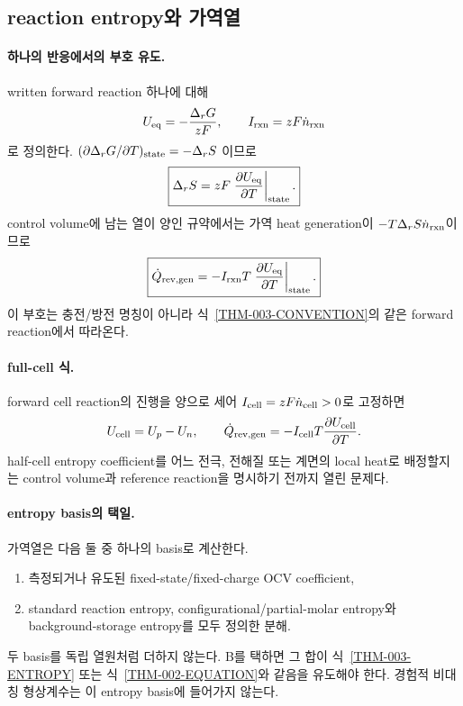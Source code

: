 \subsection{reaction entropy와 가역열}\label{THM-CH2-REVERSIBLE}

\paragraph{ 하나의 반응에서의 부호 유도.}
written forward reaction 하나에 대해
\begin{equation}
U_{\mathrm{eq}}=-\frac{\Delta_rG}{zF},\qquad
I_{\rm rxn}=zF\dot n_{\rm rxn}
\label{THM-003-CONVENTION}
\end{equation}
로 정의한다. $(\partial\Delta_rG/\partial T)_{\rm state}=-\Delta_rS$
이므로
\begin{equation}
\boxed{
\Delta_rS=zF
\left.\frac{\partial U_{\mathrm{eq}}}{\partial T}\right|_{\rm state}.
}
\label{THM-003-ENTROPY}
\end{equation}
control volume에 남는 열이 양인 규약에서는 가역 heat generation이
$-T\Delta_rS\dot n_{\rm rxn}$이므로
\begin{equation}
\boxed{
\dot Q_{\mathrm{rev},\mathrm{gen}}
=-I_{\rm rxn}T
\left.\frac{\partial U_{\mathrm{eq}}}{\partial T}\right|_{\rm state}.
}
\label{THM-003-HEAT}
\end{equation}
이 부호는 충전/방전 명칭이 아니라 식~\eqref{THM-003-CONVENTION}의
같은 forward reaction에서 따라온다.

\paragraph{ full-cell 식.}
forward cell reaction의 진행을 양으로 세어
$I_{\mathrm{cell}}=zF\dot n_{\mathrm{cell}}>0$로 고정하면
\begin{equation}
U_{\mathrm{cell}}=U_p-U_n,\qquad
\dot Q_{\mathrm{rev},\mathrm{gen}}
=-I_{\mathrm{cell}} T\frac{\partial U_{\mathrm{cell}}}{\partial T}.
\label{THM-004-EQUATION}
\end{equation}
half-cell entropy coefficient를 어느 전극, 전해질 또는 계면의
local heat로 배정할지는 control volume과 reference reaction을
명시하기 전까지 열린 문제다.

\paragraph{ entropy basis의 택일.}
가역열은 다음 둘 중 하나의 basis로 계산한다.
\begin{enumerate}[label=(\Alph*)]
\item 측정되거나 유도된 fixed-state/fixed-charge OCV coefficient,
\item standard reaction entropy, configurational/partial-molar
entropy와 background-storage entropy를 모두 정의한 분해.
\end{enumerate}
두 basis를 독립 열원처럼 더하지 않는다. B를 택하면 그 합이
식~\eqref{THM-003-ENTROPY} 또는
식~\eqref{THM-002-EQUATION}와 같음을 유도해야 한다.
경험적 비대칭 형상계수는 이 entropy basis에 들어가지 않는다.

